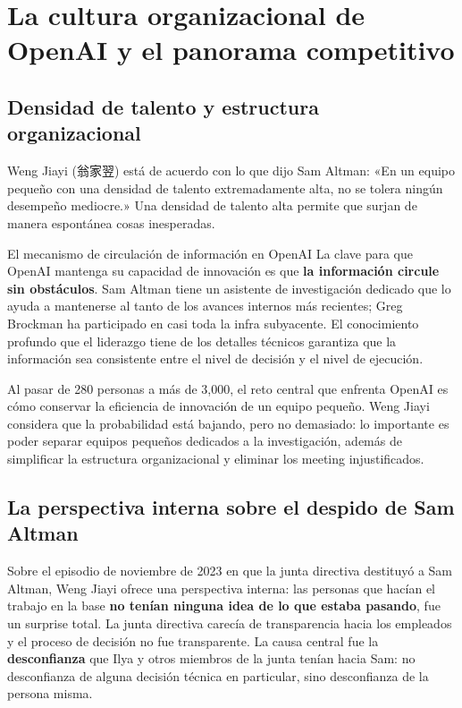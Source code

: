 \section{La cultura organizacional de OpenAI y el panorama competitivo}

\subsection{Densidad de talento y estructura organizacional}

Weng Jiayi (翁家翌) está de acuerdo con lo que dijo Sam Altman: «En un equipo pequeño con una densidad de talento extremadamente alta, no se tolera ningún desempeño mediocre.» Una densidad de talento alta permite que surjan de manera espontánea cosas inesperadas.

\begin{knowledgebox}{El mecanismo de circulación de información en OpenAI}
La clave para que OpenAI mantenga su capacidad de innovación es que \textbf{la información circule sin obstáculos}. Sam Altman tiene un asistente de investigación dedicado que lo ayuda a mantenerse al tanto de los avances internos más recientes; Greg Brockman ha participado en casi toda la infra subyacente. El conocimiento profundo que el liderazgo tiene de los detalles técnicos garantiza que la información sea consistente entre el nivel de decisión y el nivel de ejecución.
\end{knowledgebox}

Al pasar de 280 personas a más de 3,000, el reto central que enfrenta OpenAI es cómo conservar la eficiencia de innovación de un equipo pequeño. Weng Jiayi considera que la probabilidad está bajando, pero no demasiado: lo importante es poder separar equipos pequeños dedicados a la investigación, además de simplificar la estructura organizacional y eliminar los meeting injustificados.

\subsection{La perspectiva interna sobre el despido de Sam Altman}

Sobre el episodio de noviembre de 2023 en que la junta directiva destituyó a Sam Altman, Weng Jiayi ofrece una perspectiva interna: las personas que hacían el trabajo en la base \textbf{no tenían ninguna idea de lo que estaba pasando}, fue un surprise total. La junta directiva carecía de transparencia hacia los empleados y el proceso de decisión no fue transparente. La causa central fue la \textbf{desconfianza} que Ilya y otros miembros de la junta tenían hacia Sam: no desconfianza de alguna decisión técnica en particular, sino desconfianza de la persona misma.

